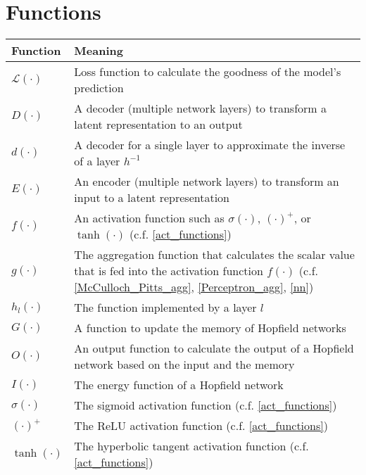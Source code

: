 \section{Functions}

\begin{tabular}{ p{3cm} p{11cm} }
	\textbf{Function} & \textbf{Meaning}\\
	\hline
	$\mathcal{L}(\cdot)$ & Loss function to calculate the goodness of the model's prediction\\
	$D(\cdot)$ & A decoder (multiple network layers) to transform a latent representation to an output\\
	$d(\cdot)$ & A decoder for a single layer to approximate the inverse of a layer $h^{-1}$\\
	$E(\cdot)$ & An encoder (multiple network layers) to transform an input to a latent representation\\
	$f(\cdot)$ & An activation function such as $\sigma(\cdot)$, $(\cdot)^{+}$, or $\tanh(\cdot)$ (c.f. \eqref{act_functions})\\
	$g(\cdot)$ & The aggregation function that calculates the scalar value that is fed into the activation function $f(\cdot)$ (c.f. \eqref{McCulloch_Pitts_agg}, \eqref{Perceptron_agg}, \eqref{nn})\\
	$h_l(\cdot)$ & The function implemented by a layer $l$\\
	$G(\cdot)$ & A function to update the memory of Hopfield networks\\
	$O(\cdot)$ & An output function to calculate the output of a Hopfield network based on the input and the memory\\
	$I(\cdot)$ & The energy function of a Hopfield network\\
	$\sigma(\cdot)$ & The sigmoid activation function (c.f. \eqref{act_functions})\\
	$(\cdot)^{+}$ & The ReLU activation function (c.f. \eqref{act_functions})\\
	 $\tanh(\cdot)$ & The hyperbolic tangent activation function (c.f. \eqref{act_functions})\\
	
\end{tabular}
